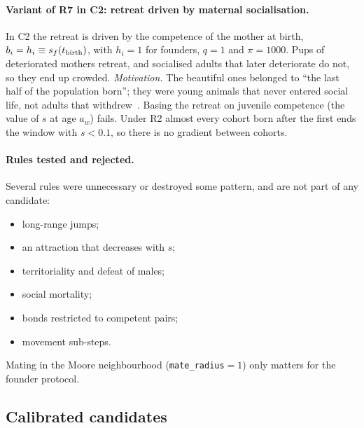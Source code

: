 \paragraph{Variant of R7 in \textsf{C2}: retreat driven by maternal socialisation.}
In \textsf{C2} the retreat is driven by the competence of the mother at birth, $b_i=h_i\equiv s_{f}(t_{\rm birth})$,
with $h_i=1$ for founders, $q=1$ and $\pi=1000$. Pups of deteriorated mothers retreat, and
socialised adults that later deteriorate do not, so they end up crowded.
\emph{Motivation.} The beautiful ones belonged to ``the last half of the population born''; they were
young animals that never entered social life, not adults that withdrew~\cite{Calhoun1973}.
Basing the retreat on juvenile competence (the value of $s$ at age $a_w$) fails. Under R2 almost every
cohort born after the first ends the window with $s<0.1$, so there is no gradient between cohorts.

\paragraph{Rules tested and rejected.}
Several rules were unnecessary or destroyed some pattern, and are not part of any candidate:
\begin{itemize}
  \item long-range jumps;
  \item an attraction that decreases with $s$;
  \item territoriality and defeat of males;
  \item social mortality;
  \item bonds restricted to competent pairs;
  \item movement sub-steps.
\end{itemize}
Mating in the Moore neighbourhood (\texttt{mate\_radius}${}=1$) only matters for the founder protocol.

\subsection{Calibrated candidates}
\label{sec:model-candidates}

